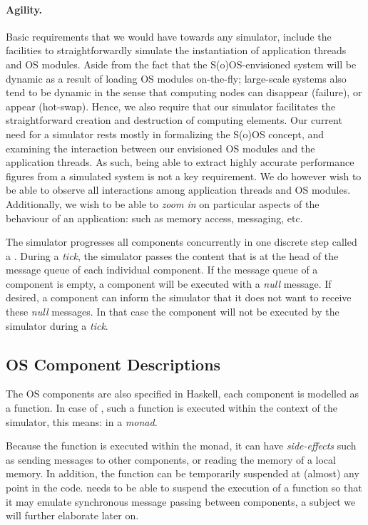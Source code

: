 \paragraph{Agility.}
Basic requirements that we would have towards any simulator, include the facilities to straightforwardly simulate the instantiation of application threads and OS modules.
Aside from the fact that the S(o)OS-envisioned system will be dynamic as a result of loading OS modules on-the-fly; large-scale systems also tend to be dynamic in the sense that computing nodes can disappear (failure), or
appear (hot-swap).
Hence, we also require that our simulator facilitates the straightforward creation and destruction of computing elements.
Our current need for a simulator rests mostly in formalizing the S(o)OS concept, and examining the interaction between our envisioned OS modules and the application threads.
As such, being able to extract highly accurate performance figures from a simulated system is not a key requirement.
We do however wish to be able to observe all interactions among application threads and OS modules.
Additionally, we wish to be able to \emph{zoom in} on particular aspects of the behaviour of an application: such as memory access, messaging, etc.

The simulator progresses all components concurrently in one discrete step called a .
During a \emph{tick}, the simulator passes the content that is at the head of the message queue of each individual component.
If the message queue of a component is empty, a component will be executed with a \emph{null} message.
If desired, a component can inform the simulator that it does not want to receive these \emph{null} messages.
In that case the component will not be executed by the simulator during a \emph{tick}.


\subsection{OS Component Descriptions}

The OS components are also specified in Haskell, each component is modelled as a function.
In case of \soosim, such a function is executed within the context of the simulator, this means: in a \emph{monad}.

Because the function is executed within the monad, it can have \emph{side-effects} such as sending messages to other components, or reading the memory of a local memory.
In addition, the function can be temporarily suspended at (almost) any point in the code.
\soosim needs to be able to suspend the execution of a function so that it may emulate synchronous message passing between components, a subject we will further elaborate later on.

